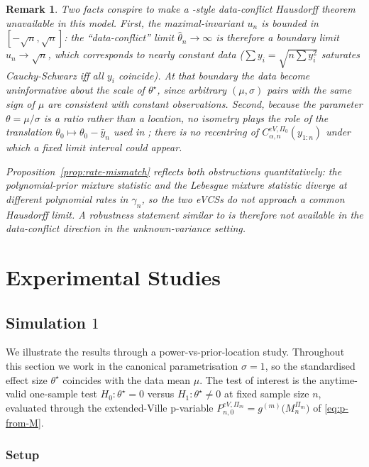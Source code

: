 \documentclass{article}%
\newtheorem{remark}[theorem]{Remark}
\newcommand{\1}{\mathbf{1}}
\begin{document}
\begin{remark}\label{rem:why-no-data-conflict}
Two facts conspire to make a \cite{Cortinovis2025}-style data-conflict Hausdorff theorem unavailable in this model. First, the maximal-invariant \(u_n\) is bounded in \([-\sqrt n,\sqrt n]\): the ``data-conflict'' limit \(\widehat\theta_n\to\infty\) is therefore a boundary limit \(u_n\to\sqrt n\), which corresponds to nearly constant data (\(\sum y_i=\sqrt{n\sum y_i^2}\) saturates Cauchy-Schwarz iff all \(y_i\) coincide). At that boundary the data
become uninformative about the scale of \(\theta^\star\), since arbitrary \((\mu,\sigma)\) pairs with the same sign of \(\mu\) are consistent with constant observations. Second, because the parameter \(\theta=\mu/\sigma\) is a ratio rather than a location, no isometry plays the role of the translation
\(\theta_0\mapsto\theta_0-\bar y_n\) used in \cite[Theorem~4.3]{Cortinovis2025}; there is no recentring of \(C^{eV,\Pi_0}_{\alpha,n}(y_{1:n})\) under which a fixed limit interval could appear.

Proposition~\ref{prop:rate-mismatch} reflects both obstructions quantitatively: the polynomial-prior mixture statistic and the Lebesgue mixture statistic diverge at different polynomial rates in \(\gamma_n\), so the two eVCSs do not approach a common Hausdorff limit. A robustness statement similar to \cite{Cortinovis2025} is therefore not available in the data-conflict direction in the unknown-variance setting.
\end{remark}

\section{Experimental Studies}
\subsection{Simulation $1$}\label{sec:sim1}
We illustrate the results through a power-vs-prior-location study. Throughout this section we work in the
canonical parametrisation \(\sigma=1\), so the standardised effect size \(\theta^\star\) coincides with the data mean \(\mu\). The test of interest is the anytime-valid one-sample test \(H_0:\theta^\star=0\) versus \(H_1:\theta^\star\neq 0\) at fixed
sample size \(n\), evaluated through the extended-Ville p-variable
\(P_{n,0}^{eV,\Pi_m}=g^{(m)}\bigl(M_n^{\Pi_m}\bigr)\) of
\eqref{eq:p-from-M}.


\subsubsection{Setup}\label{ssec:exp-setup}
\end{document}
